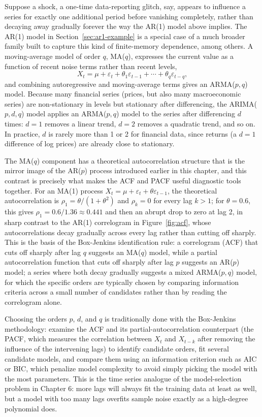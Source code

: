 \documentclass[../ai_in_finance]{subfiles}
\begin{document}
Suppose a shock, a one-time data-reporting glitch, say, appears to influence a series for exactly one additional period before vanishing completely, rather than decaying away gradually forever the way the AR(1) model above implies. The AR(1) model in Section~\ref{sec:ar1-example} is a special case of a much broader family built to capture this kind of finite-memory dependence, among others. A moving-average model of order $q$, MA($q$), expresses the current value as a function of recent noise terms rather than recent levels,
\begin{equation*}
X_t = \mu + \varepsilon_t + \theta_1 \varepsilon_{t-1} + \cdots + \theta_q \varepsilon_{t-q},
\end{equation*}
and combining autoregressive and moving-average terms gives an ARMA($p,q$) model. Because many financial series (prices, but also many macroeconomic series)
are non-stationary in levels
but stationary after differencing, the ARIMA($p,d,q$) model applies an ARMA($p,q$) model to the series after
differencing $d$ times: $d=1$ removes a linear trend, $d=2$ removes a quadratic trend, and so on. In practice, $d$ is rarely more than 1 or 2 for financial data,
since returns (a $d=1$ difference of log prices) are already close to stationary.

The MA($q$) component has a theoretical autocorrelation structure that is the mirror image of the AR($p$) process introduced earlier in this chapter, and this
contrast is precisely what makes the ACF and PACF useful diagnostic tools together. For an MA(1) process $X_t = \mu + \varepsilon_t + \theta \varepsilon_{t-1}$,
the theoretical autocorrelation is $\rho_1 = \theta/(1+\theta^2)$ and $\rho_k=0$ for every lag $k>1$; for $\theta=0.6$, this gives $\rho_1 = 0.6/1.36 \approx 0.441$ and
then an abrupt drop to zero at lag 2, in sharp contrast to the AR(1) correlogram in Figure~\ref{fig:acf}, whose autocorrelations decay gradually across every lag
rather than cutting off sharply. This is the basis of the Box-Jenkins identification rule: a correlogram (ACF) that cuts off sharply after lag $q$ suggests an
MA($q$) model, while a partial autocorrelation function that cuts off sharply after lag $p$ suggests an AR($p$) model; a series where both decay gradually
suggests a mixed ARMA($p,q$) model, for which the specific orders are typically chosen by comparing information criteria across a small number of candidates
 rather than by reading the correlogram alone.

Choosing the orders $p$, $d$, and $q$ is traditionally done with the Box-Jenkins methodology: examine the ACF and its partial-autocorrelation
counterpart (the PACF, which measures the correlation between $X_t$ and $X_{t-k}$ after removing the influence of the
intervening lags) to identify candidate orders, fit several candidate models, and compare them using an information criterion such as AIC or BIC, which penalize
model complexity to avoid simply picking the model with the most parameters. This is the time series analogue of the model-selection problem in Chapter 6:
more lags will always fit the training data at least as well, but a model with too many lags overfits sample noise exactly as a high-degree polynomial does.
\end{document}
